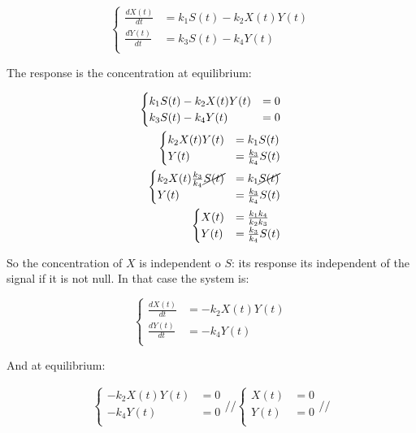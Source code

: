     $$\begin{cases}
      \frac{dX(t)}{dt} &= k_1S(t) - k_2X(t)Y(t)\\
      \frac{dY(t)}{dt} &= k_3S(t) - k_4Y(t)\\
    \end{cases}$$

    The response is the concentration at equilibrium:

    \begin{align*}
      \begin{cases}
        k_1S(t) - k_2X(t)Y(t) &= 0\\
        k_3S(t) - k_4Y(t) &= 0\\
      \end{cases}\\
      \begin{cases}
        k_2X(t)Y(t) &= k_1S(t)\\
        Y(t) &=\frac{k_3}{k_4}S(t)\\
      \end{cases}\\
      \begin{cases}
        k_2X(t)\frac{k_3}{k_4}\cancel{S(t)} &= k_1\cancel{S(t)}\\
        Y(t) &=\frac{k_3}{k_4}S(t)\\
      \end{cases}\\
      \begin{cases}
        X(t) &= \frac{k_1k_4}{k_2k_3}\\
        Y(t) &=\frac{k_3}{k_4}S(t)\\
      \end{cases}\\
    \end{align*}

    So the concentration of $X$ is independent o $S$: its response its independent of the signal if it is not null.
    In that case the system is:

    $$\begin{cases}
      \frac{dX(t)}{dt} &=  - k_2X(t)Y(t)\\
      \frac{dY(t)}{dt} &= - k_4Y(t)\\
    \end{cases}$$

    And at equilibrium:

    \begin{align*}
      \begin{cases}
         - k_2X(t)Y(t) &= 0\\
         - k_4Y(t) &= 0\\
      \end{cases}//
      \begin{cases}
         X(t) &= 0\\
         Y(t) &= 0\\
      \end{cases}//
    \end{align*}

